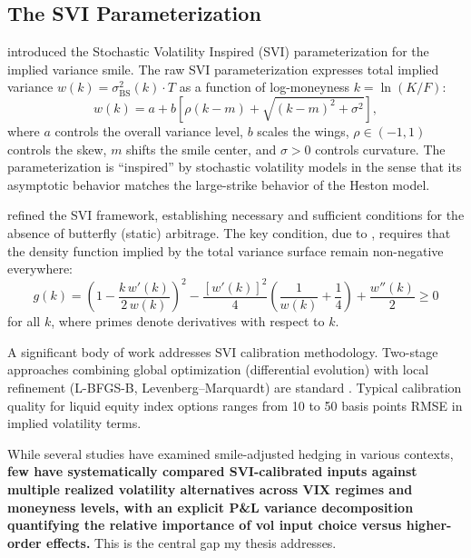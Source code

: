 \documentclass[12pt, letterpaper]{article}
\begin{document}
\subsection{The SVI Parameterization}

\citet{Gatheral2004} introduced the Stochastic Volatility Inspired (SVI) parameterization for the implied variance smile. The raw SVI parameterization expresses total implied variance $w(k) = \sigma^2_{\text{BS}}(k) \cdot T$ as a function of log-moneyness $k = \ln(K/F)$:
\begin{equation}
    w(k) = a + b\left[\rho(k - m) + \sqrt{(k - m)^2 + \sigma^2}\right],
    \label{eq:svi}
\end{equation}
where $a$ controls the overall variance level, $b$ scales the wings, $\rho \in (-1, 1)$ controls the skew, $m$ shifts the smile center, and $\sigma > 0$ controls curvature. The parameterization is ``inspired'' by stochastic volatility models in the sense that its asymptotic behavior matches the large-strike behavior of the Heston model.

\citet{Gatheral2014} refined the SVI framework, establishing necessary and sufficient conditions for the absence of butterfly (static) arbitrage. The key condition, due to \citet{Durrleman2005}, requires that the density function implied by the total variance surface remain non-negative everywhere:
\begin{equation}
    g(k) = \left(1 - \frac{k\, w'(k)}{2\, w(k)}\right)^2 - \frac{[w'(k)]^2}{4}\left(\frac{1}{w(k)} + \frac{1}{4}\right) + \frac{w''(k)}{2} \geq 0
    \label{eq:durrleman}
\end{equation}
for all $k$, where primes denote derivatives with respect to $k$.

A significant body of work addresses SVI calibration methodology. Two-stage approaches combining global optimization (differential evolution) with local refinement (L-BFGS-B, Levenberg--Marquardt) are standard \citep{Storn1997}. Typical calibration quality for liquid equity index options ranges from 10 to 50 basis points RMSE in implied volatility terms.

While several studies have examined smile-adjusted hedging in various contexts, \textbf{few have systematically compared SVI-calibrated inputs against multiple realized volatility alternatives across VIX regimes and moneyness levels, with an explicit P\&L variance decomposition quantifying the relative importance of vol input choice versus higher-order effects.} This is the central gap my thesis addresses.
\end{document}
